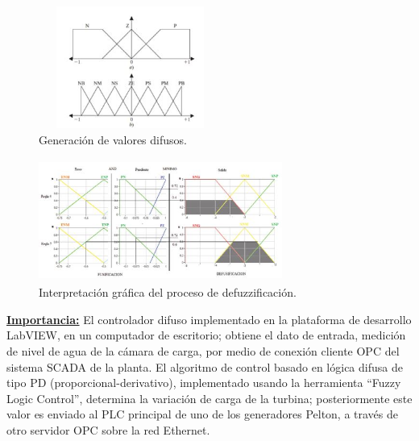 \documentclass[10pt,conference]{IEEEtran}
\begin{document}
\begin{enumerate}
     \begin{figure}[H]
    \begin{center}
    \includegraphics[width=6cm,height=4cm]{figuras/M4.JPG}
    \caption{Generación de valores difusos.}
    \label{M4} 
    \end{center}
    \end{figure}

    \begin{figure}[H]
    \begin{center}
    \includegraphics[width=8cm,height=4cm]{figuras/M5.JPG}
    \caption{Interpretación gráfica del proceso de defuzzificación.}
    \label{M5} 
    \end{center}
    \end{figure}

\textbf{\underline{Importancia:}} 
El controlador difuso implementado en la plataforma de desarrollo LabVIEW, en un computador de escritorio; obtiene el dato de entrada, medición de nivel de agua de la cámara de carga, por medio de conexión cliente OPC del sistema SCADA de la planta. El algoritmo de control basado en lógica difusa de tipo PD (proporcional-derivativo), implementado usando la herramienta “Fuzzy Logic Control”, determina la variación de carga de la turbina; posteriormente este valor es enviado al PLC principal de uno de los generadores Pelton, a través de otro servidor OPC sobre la red Ethernet.


\end{enumerate} 
\end{document}

